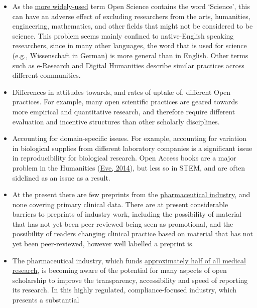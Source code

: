 \begin{itemize}
\item
  As the
  \href{https://trends.google.com/trends/explore?date=2004-01-01\%202018-12-28\&q=open\%20scholarship,open\%20science}{more
  widely-used} term Open Science contains the word `Science', this can
  have an adverse effect of excluding researchers from the arts,
  humanities, engineering, mathematics, and other fields that might not
  be considered to be science. This problem seems mainly confined to
  native-English speaking researchers, since in many other languages,
  the word that is used for science (e.g., Wissenschaft in German) is
  more general than in English. Other terms such as e-Research and
  Digital Humanities describe similar practices across different
  communities.
\item
  Differences in attitudes towards, and rates of uptake of, different
  Open practices. For example, many open scientific practices are geared
  towards more empirical and quantitative research, and therefore
  require different evaluation and incentive structures than other
  scholarly disciplines.
\item
  Accounting for domain-specific issues. For example, accounting for
  variation in biological supplies from different laboratory companies
  is a significant issue in reproducibility for biological research.
  Open Access books are a major problem in the Humanities
  (\href{http://dx.doi.org/10.1017/CBO9781316161012}{Eve, 2014}), but
  less so in STEM, and are often sidelined as an issue as a result.
\item
  At the present there are few preprints from the
  \href{https://openpharma.blog/2017/08/14/when-will-preprints-take-off-in-medicine/}{pharmaceutical
  industry}, and none covering primary clinical data. There are at
  present considerable barriers to preprints of industry work, including
  the possibility of material that has not yet been peer-reviewed being
  seen as promotional, and the possibility of readers changing clinical
  practice based on material that has not yet been peer-reviewed,
  however well labelled a preprint is.
\item
  The pharmaceutical industry, which funds
  \href{https://jamanetwork.com/journals/jama/fullarticle/185198}{approximately
  half of all medical research}, is becoming aware of the potential for
  many aspects of open scholarship to improve the transparency,
  accessibility and speed of reporting its research. In this highly
  regulated, compliance-focused industry, which presents a substantial

\end{itemize}

